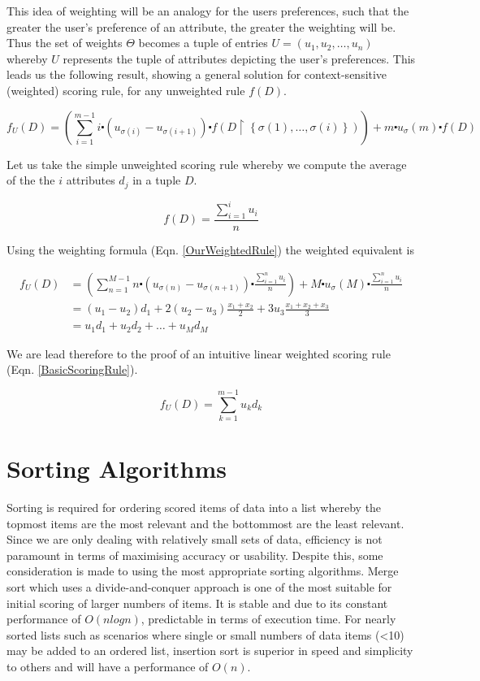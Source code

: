 This idea of weighting will be an analogy for the users preferences, such that the greater the user's preference of an attribute, the greater the weighting will be. Thus the set of weights $\Theta$ becomes a tuple of entries $ U = (u_1, u_2, \dots, u_n)$ whereby $U$ represents the tuple of attributes depicting the user's preferences. This leads us the following result, showing a general solution for context-sensitive (weighted) scoring rule, for any unweighted rule $f(D)$.

\begin{equation}\label{OurWeightedRule}	
	f_U (D) = \left(\sum_{i=1}^{m-1} i\centerdot (u_{\sigma{(i)}} - u_{\sigma{(i+1)}})\centerdot f(D\upharpoonright\left\{\sigma(1),\dots,\sigma(i)\right\})\right) + m \centerdot u_\sigma{(m)} \centerdot f(D)
\end{equation}

Let us take the simple unweighted scoring rule whereby we compute the average of the the $i$ attributes $d_j$ in a tuple $D$.

$$f(D) = \frac{\sum_{i=1}^{i} u_i}{n}$$

Using the weighting formula (Eqn. \ref{OurWeightedRule}) the weighted equivalent is

\begin{align}\label{OurWeightedRuleDerivation}
f_U (D) &= \left(\sum_{n=1}^{M-1} n\centerdot (u_{\sigma{(n)}} - u_{\sigma{(n+1)}})\centerdot \frac{\sum_{i=1}^{n} u_i}{n}\right) + M \centerdot u_\sigma{(M)} \centerdot \frac{\sum_{i=1}^{n} u_i}{n} 
\\ &= (u_1-u_2)d_1 + 2(u_2-u_3)\frac{x_1+x_2}{2} + 3u_3\frac{x_1+x_2+x_3}{3}
\\ &= u_1d_1 + u_2d_2 + \dots + u_Md_M
\end{align}

We are lead therefore to the proof of an intuitive linear weighted scoring rule (Eqn. \ref{BasicScoringRule}).

\begin{equation}\label{BasicScoringRule}
f_U (D) = \sum_{k=1}^{m-1} u_kd_k
\end{equation}

\section{Sorting Algorithms}

Sorting is required for ordering scored items of data into a list whereby the topmost items are the most relevant and the bottommost are the least relevant. Since we are only dealing with relatively small sets of data, efficiency is not paramount in terms of maximising accuracy or usability. Despite this, some consideration is made to using the most appropriate sorting algorithms. 
Merge sort which uses a divide-and-conquer approach is one of the most suitable for initial scoring of larger numbers of items. It is stable and due to its constant performance of $O(nlogn)$, predictable in terms of execution time. 
For nearly sorted lists such as scenarios where single or small numbers of data items (<10) may be added to an ordered list, insertion sort is superior in speed and simplicity to others and will have a performance of $O(n)$.

